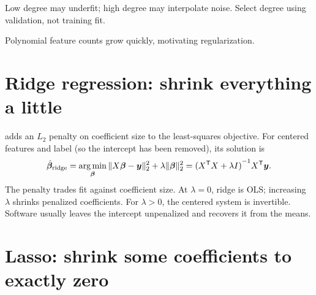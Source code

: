 \begin{mlfigure}
\end{mlfigure}

\begin{intuition}
Low degree may underfit; high degree may interpolate noise. Select degree using validation, not training fit.
\end{intuition}

Polynomial feature counts grow quickly, motivating regularization.

\section{Ridge regression: shrink everything a little}

 adds an $L_2$ penalty on coefficient size to the least-squares objective. For centered features and label (so the intercept has been removed), its solution is
\[
  \hat{\bm{\beta}}_{\mathrm{ridge}}
  =\operatorname*{arg\,min}_{\bm{\beta}}
  \|X\bm{\beta}-\bm{y}\|_2^2
  +\lambda\|\bm{\beta}\|_2^2
  ={(X^{\mathsf T}X+\lambda I)}^{-1}X^{\mathsf T}\bm{y}.
\]
The penalty trades fit against coefficient size. At $\lambda=0$, ridge is OLS; increasing $\lambda$ shrinks penalized coefficients. For $\lambda>0$, the centered system is invertible. Software usually leaves the intercept unpenalized and recovers it from the means.

\section{Lasso: shrink some coefficients to exactly zero}

